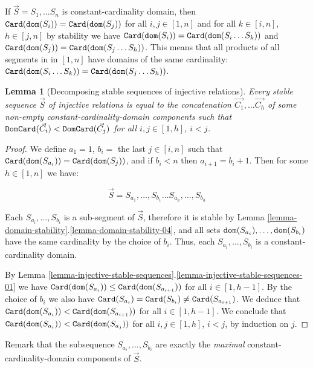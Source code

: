 \documentclass{lmcs}
\newtheorem{lemma}[theorem]{Lemma}
\begin{document}
If $\vec{S}=S_1, \ldots S_n$ is constant-cardinality domain, then ${\tt Card}({\tt dom}(S_i)) = {\tt Card}({\tt dom}(S_j))$ for all $i,j \in [1,n]$ and for all $k \in [i,n]$, $h \in [j,n]$ by
stability we have
${\tt Card}({\tt dom}(S_i)) ={\tt Card}({\tt dom}(S_i \ldots S_k))$ and
${\tt Card}({\tt dom}(S_j)) = {\tt Card}({\tt dom}(S_j \ldots S_h))$. This means that all products of
all segments in in $[1,n]$ have domains of the same cardinality: 
${\tt Card}({\tt dom}(S_i \ldots S_k)) = {\tt Card}({\tt dom}(S_j \ldots S_h))$.

\begin{lemma}[Decomposing stable sequences of injective relations]
Every stable sequence $\vec{S}$ of injective relations is equal to the 
concatenation $\vec{C_1}, \ldots \vec{C_h}$
of some non-empty constant-cardinality-domain components 
such that ${\tt DomCard}(\vec{C_i})  < {\tt DomCard}(\vec{C_j})$ for all $i,j \in [1,h]$, $i < j$.
\end{lemma}

\begin{proof}
We define $a_1=1$, $b_i = $ the last $j \in [i,n]$ such that 
${\tt Card}({\tt dom}(S_{a_i})) = {\tt Card}({\tt dom}(S_j))$, and if $b_i<n$ then $a_{i+1}=b_i + 1$.
Then for some $h \in [1,n]$ we have:

$$
\vec{S}
=
S_{a_1},\ldots,S_{b_1}
\ldots
S_{a_{h}},\ldots,S_{b_{h}}
$$

Each $S_{a_{i}},\ldots,S_{b_{i}}$ is a sub-segment of $\vec{S}$, therefore it is stable
by Lemma \ref{lemma-domain-stability}.\ref{lemma-domain-stability-04}, 
and all sets ${\tt dom}(S_{a_{i}}), \ldots, {\tt dom}(S_{b_{i}})$ have the same cardinality 
by the choice of $b_i$. 
Thus, each $S_{a_{i}},\ldots,S_{b_{i}}$ is a constant-cardinality domain. 

By Lemma \ref{lemma-injective-stable-sequences}.\ref{lemma-injective-stable-sequences-01}
we have ${\tt Card}({\tt dom}(S_{a_i})) \le {\tt Card}({\tt dom}(S_{a_{i+1}}))$ for all $i \in [1,h-1]$.
By the choice of $b_i$ we also have 
${\tt Card}(S_{a_{i}}) = {\tt Card}(S_{b_{i}}) \not = {\tt Card}(S_{a_{i+1}})$.
We deduce that
${\tt Card}({\tt dom}(S_{a_i})) <  {\tt Card}({\tt dom}(S_{a_{i+1}}))$ for all $i \in [1,h-1]$.
We conclude  that
${\tt Card}({\tt dom}(S_{a_i})) <  {\tt Card}({\tt dom}(S_{a_{j}}))$ for all $i,j \in [1,h]$, $i < j$,
by induction on $j$.

\end{proof}

Remark that the subsequence $S_{a_{i}}, \ldots, S_{b_{i}}$ 
are exactly the \emph{maximal} constant-cardinality-domain components of $\vec{S}$.
\end{document}
